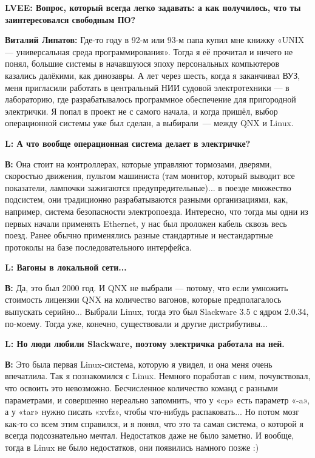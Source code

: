 \documentclass[10pt, a5paper]{article}
\begin{document}
{\noindent \bf LVEE: Вопрос, который всегда легко задавать: а как получилось, что ты заинтересовался свободным ПО?}

{\noindent \bf Виталий Липатов:} Где-то году в 92-м или 93-м папа купил мне книжку «UNIX --- универсальная среда программирования». Тогда я её прочитал и ничего не понял, большие системы в начавшуюся эпоху персональных компьютеров казались далёкими, как динозавры. А лет через шесть, когда я заканчивал ВУЗ, меня пригласили работать в центральный НИИ судовой электротехники --- в лабораторию, где разрабатывалось программное обеспечение для пригородной электрички. Я попал в проект не с самого начала, и когда пришёл, выбор операционной системы уже был сделан, а выбирали~--- между QNX и Linux. 

{\noindent \bf L: А что вообще операционная система делает в электричке?}

{\noindent \bf В:} Она стоит на контроллерах, которые управляют тормозами, дверями, скоростью движения,  пультом машиниста (там монитор, который выводит все показатели, лампочки зажигаются предупредительные)... в поезде множество подсистем, они традиционно разрабатываются разными организациями, как, например, система безопасности электропоезда. Интересно, что тогда мы одни из первых начали применять Ethernet, у нас был проложен кабель сквозь весь поезд. Ранее обычно применялись разные стандартные и нестандартные протоколы на базе последовательного интерфейса.

{\noindent \bf L: Вагоны в локальной сети...}

{\noindent \bf В:} Да, это был 2000 год. И QNX не выбрали --- потому, что если умножить стоимость лицензии QNX на количество вагонов, которые предполагалось выпускать серийно... Выбрали Linux, тогда это был Slackware 3.5 с ядром 2.0.34, по-моему. Тогда уже, конечно, существовали и другие дистрибутивы...

{\noindent \bf L: Но люди любили Slackware, поэтому электричка работала на ней.}

{\noindent \bf В:} Это была первая Linux-система, которую я увидел, и она меня очень впечатлила. Так я познакомился с Linux. Немного поработав с ним, почувствовал, что освоить это невозможно. Бесчисленное количество команд с разными параметрами, и совершенно нереально запомнить, что у «cp»  есть параметр «-a», а у «tar» нужно писать «xvfz», чтобы что-нибудь распаковать... Но потом мозг как-то со всем этим справился, и я понял, что это та самая система, о которой я всегда подсознательно мечтал. Недостатков даже не было заметно. И вообще, тогда в Linux не было недостатков, они появились намного позже :)
\end{document}
